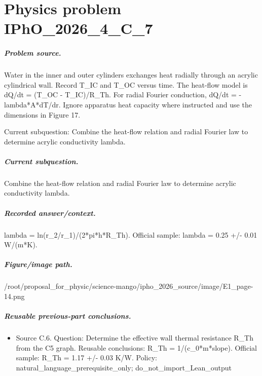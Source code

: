 
\chapter{Physics problem IPhO\_2026\_4\_C\_7}
\label{ch:IPhO2026Problems_problem_IPhO_2026_4_C_7}

\paragraph{Problem source.}
Water in the inner and outer cylinders exchanges heat radially through an
acrylic cylindrical wall.  Record T\_IC and T\_OC versus time.  The heat-flow
model is dQ/dt = (T\_OC - T\_IC)/R\_Th.  For radial Fourier conduction,
dQ/dt = -lambda*A*dT/dr.  Ignore apparatus heat capacity where instructed and
use the dimensions in Figure 17.

Current subquestion:
Combine the heat-flow relation and radial Fourier law to determine acrylic conductivity lambda.

\paragraph{Current subquestion.}
Combine the heat-flow relation and radial Fourier law to determine acrylic conductivity lambda.

\paragraph{Recorded answer/context.}
lambda = ln(r\_2/r\_1)/(2*pi*h*R\_Th). Official sample: lambda = 0.25 +/- 0.01 W/(m*K).

\paragraph{Figure/image path.}
/root/proposal\_for\_physic/science-mango/ipho\_2026\_source/image/E1\_page-14.png

\paragraph{Reusable previous-part conclusions.}
\begin{itemize}
\item Source C.6. Question: Determine the effective wall thermal resistance R\_Th from the C5 graph. Reusable conclusions: R\_Th = 1/(c\_0*m*slope). Official sample: R\_Th = 1.17 +/- 0.03 K/W. Policy: natural\_language\_prerequisite\_only; do\_not\_import\_Lean\_output
\end{itemize}

